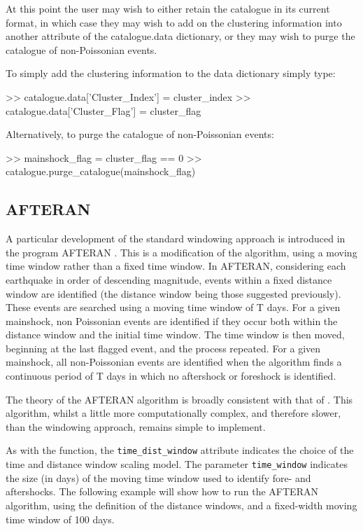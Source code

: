 At this point the user may wish to either retain the catalogue in its current format, in which case they may wish to add on the clustering information into another attribute of the catalogue.data dictionary, or they may wish to purge the catalogue of non-Poissonian events. 

To simply add the clustering information to the data dictionary simply type:

\begin{python}[frame=single]
>> catalogue.data['Cluster_Index'] = cluster_index
>> catalogue.data['Cluster_Flag'] = cluster_flag
\end{python}
 
Alternatively, to purge the catalogue of non-Poissonian events:

\begin{python}[frame=single]
>> mainshock_flag = cluster_flag == 0
>> catalogue.purge_catalogue(mainshock_flag)
\end{python}


\subsection{AFTERAN \parencite{Musson1999PSHABalkan}}

A particular development of the standard windowing approach is introduced in the program AFTERAN \parencite{Musson1999PSHABalkan}. This is a modification of the \textcite{GardnerKnopoff1974} algorithm, using a moving time window rather than a fixed time window. In AFTERAN, considering each earthquake in order of descending magnitude, events within a fixed distance window are identified (the distance window being those suggested previously). These events are searched using a moving time window of T days. For a given mainshock, non Poissonian events are identified if they occur both within the distance window and the initial time window. The time window is then moved, beginning at the last flagged event, and the process repeated. For a given mainshock, all non-Poissonian events are identified when the algorithm finds a continuous period of T days in which no aftershock or foreshock is identified. 

The theory of the AFTERAN algorithm is broadly consistent with that of \textcite{GardnerKnopoff1974}. This algorithm, whilst a little more computationally complex, and therefore slower, than the \textcite{GardnerKnopoff1974} windowing approach, remains simple to implement. 

As with the \textcite{GardnerKnopoff1974} function, the \verb=time_dist_window= attribute indicates the choice of the time and distance window scaling model. The parameter \verb=time_window= indicates the size (in days) of the moving time window used to identify fore- and aftershocks. The following example will show how to run the AFTERAN algorithm, using the  \textcite{GardnerKnopoff1974} definition of the distance windows, and a fixed-width moving time window of 100 days.

